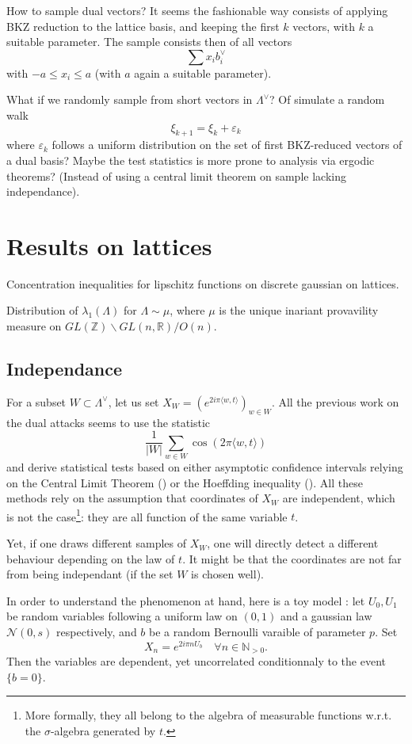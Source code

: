 \documentclass{article}
\begin{document}
How to sample dual vectors? It seems the fashionable way consists of applying BKZ reduction to the lattice basis, and keeping the first $k$ vectors, with $k$ a suitable parameter. The sample consists then of all vectors 
$$\sum x_i b_i^{\vee}$$
with $-a \leq x_i \leq a$ (with $a$ again a suitable parameter).  

What if we randomly sample from short vectors in $\Lambda^\vee$? Of simulate a random walk 
$$\xi_{k+1} = \xi_k +\varepsilon_k$$
where $\varepsilon_k$ follows a uniform distribution on the set of first BKZ-reduced vectors of a dual basis? Maybe the test statistics is more prone to analysis via ergodic theorems? (Instead of using a central limit theorem on sample lacking independance).

\section{Results on lattices}

Concentration inequalities for lipschitz functions on discrete gaussian on lattices.

Distribution of $\lambda_1(\Lambda)$ for $\Lambda \sim \mu$, where $\mu$ is the unique inariant provavility measure on $GL(\mathbb Z ) \backslash GL(n,\mathbb R) / O(n) $.

\subsection{Independance}

For a subset $W\subset \Lambda^\vee$, let us set $X_W = (e^{2 i \pi \langle w , t \rangle})_{w\in W}$. All the previous work on the dual attacks seems to use the statistic
$$\frac{1}{|W|} \sum_{w\in W } \cos( 2\pi \langle w , t\rangle ) $$
and derive statistical tests based on either asymptotic confidence intervals relying on the Central Limit Theorem (\cite{ducas2023does}) or the Hoeffding inequality (\cite{pouly2023provable}). All these methods rely on the assumption that coordinates of $X_W$ are independent, which is not the case\footnote{More formally, they all belong to the algebra of measurable functions w.r.t. the $\sigma$-algebra generated by $t$.}: they are all function of the same variable $t$.

Yet, if one draws different samples of $X_W$, one will directly detect a different behaviour depending on the law of $t$. It might be that the coordinates are not far from being independant (if the set $W$ is chosen well). 

In order to understand the phenomenon at hand, here is a toy model : let $U_0, U_1$ be random variables following a uniform law on $(0,1)$ and a gaussian law $\mathcal N(0,s)$ respectively, and $b$ be a random Bernoulli varaible of parameter $p$. Set 
$$X_n = e^{2i\pi n U_b}\quad \forall n \in \mathbb N_{>0}. $$
Then the variables are dependent, yet uncorrelated conditionnaly to the event $\{b = 0\}$.      
\end{document}
